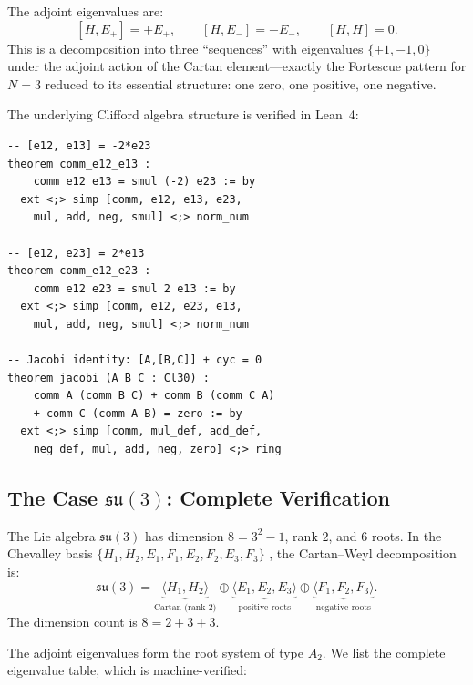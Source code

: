\documentclass[11pt]{article}
\newcommand{\so}{\mathfrak{so}}
\newcommand{\su}{\mathfrak{su}}
\newcommand{\Cl}{\mathrm{Cl}}
\begin{document}
The adjoint eigenvalues are:
\begin{equation}\label{eq:su2-eigenvalues}
  [H, E_+] = +E_+, \qquad [H, E_-] = -E_-, \qquad [H, H] = 0.
\end{equation}
This is a decomposition into three ``sequences'' with
eigenvalues $\{+1, -1, 0\}$ under the adjoint action of the Cartan
element---exactly the Fortescue pattern for $N = 3$ reduced to its
essential structure: one zero, one positive, one negative.

The underlying Clifford algebra structure is verified in Lean~4:

\begin{lstlisting}[caption={$\so(3)$ structure constants from $\Cl(3,0)$ (excerpt from \texttt{grade2\_lie\_algebra.lean}).}]
-- [e12, e13] = -2*e23
theorem comm_e12_e13 :
    comm e12 e13 = smul (-2) e23 := by
  ext <;> simp [comm, e12, e13, e23,
    mul, add, neg, smul] <;> norm_num

-- [e12, e23] = 2*e13
theorem comm_e12_e23 :
    comm e12 e23 = smul 2 e13 := by
  ext <;> simp [comm, e12, e23, e13,
    mul, add, neg, smul] <;> norm_num

-- Jacobi identity: [A,[B,C]] + cyc = 0
theorem jacobi (A B C : Cl30) :
    comm A (comm B C) + comm B (comm C A)
    + comm C (comm A B) = zero := by
  ext <;> simp [comm, mul_def, add_def,
    neg_def, mul, add, neg, zero] <;> ring
\end{lstlisting}

\subsection{The Case $\su(3)$: Complete Verification}

The Lie algebra $\su(3)$ has dimension $8 = 3^2 - 1$, rank $2$, and
$6$ roots. In the Chevalley basis $\{H_1, H_2, E_1, F_1, E_2, F_2,
E_3, F_3\}$ \cite{georgi1999,fulton1991}, the Cartan--Weyl
decomposition is:
\begin{equation}\label{eq:su3-decomp}
  \su(3) = \underbrace{\langle H_1, H_2 \rangle}_{\text{Cartan (rank 2)}}
    \oplus \underbrace{\langle E_1, E_2, E_3 \rangle}_{\text{positive roots}}
    \oplus \underbrace{\langle F_1, F_2, F_3 \rangle}_{\text{negative roots}}.
\end{equation}
The dimension count is $8 = 2 + 3 + 3$.

The adjoint eigenvalues form the root system of type $A_2$. We list
the complete eigenvalue table, which is machine-verified:
\end{document}
